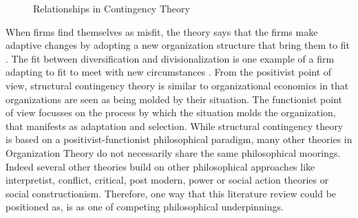 \documentclass[12pt]{article}
\begin{document}
\begin{figure}[h]
\centering
\begin{adjustbox}{width=\textwidth}
\end{adjustbox}
\caption{Relationships in Contingency Theory \citep{Donaldson1987}}
\label{figure:sct}
\end{figure}

When firms find themselves as misfit, the theory says that the firms make adaptive changes by adopting a new organization structure that bring them to fit \citep{Donaldson2001}. The fit between diversification and divisionalization is one example of a firm adapting to fit to meet with new circumstances \citep{Donaldson1987}. From the positivist point of view, structural contingency theory is similar to organizational economics in that organizations are seen as being molded by their situation. The functionist point of view focusses on the process by which the situation molds the organization, that manifests as adaptation and selection. While structural contingency theory is based on a positivist-functionist philosophical paradigm, many other theories in Organization Theory do not necessarily share the same philosophical moorings. Indeed several other theories build on other philosophical approaches like interpretist, conflict, critical, post modern, power or social action theories or social constructionism. Therefore, one way that this literature review could be positioned as, is as one of competing philosophical underpinnings.
\end{document}
